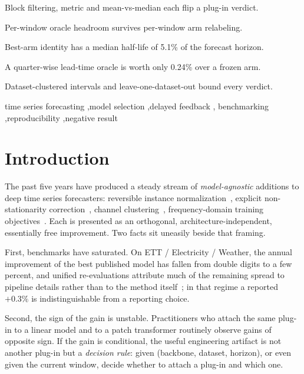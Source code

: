 \documentclass[a4paper,fleqn]{cas-sc}
\begin{document}
\begin{highlights}
\item Block filtering, metric and mean-vs-median each flip a plug-in verdict.
\item Per-window oracle headroom survives per-window arm relabeling.
\item Best-arm identity has a median half-life of 5.1\% of the forecast horizon.
\item A quarter-wise lead-time oracle is worth only 0.24\% over a frozen arm.
\item Dataset-clustered intervals and leave-one-dataset-out bound every verdict.
\end{highlights}

\begin{keywords}
time series forecasting \sep model selection \sep delayed feedback \sep
benchmarking \sep reproducibility \sep negative result
\end{keywords}

\maketitle

\section{Introduction}

The past five years have produced a steady stream of \emph{model-agnostic}
additions to deep time series forecasters: reversible instance
normalization~\cite{revin}, explicit non-stationarity correction~\cite{san},
channel clustering~\cite{ccm}, frequency-domain training objectives~\cite{fredf}. Each is
presented as an orthogonal, architecture-independent, essentially free
improvement. Two facts sit uneasily beside that framing.

First, benchmarks have saturated. On ETT / Electricity / Weather, the annual
improvement of the best published model has fallen from double digits to a few
percent, and unified re-evaluations attribute much of the remaining spread to
pipeline details rather than to the method itself~\cite{tfb,champions}; in that
regime a reported $+0.3\%$ is indistinguishable from a reporting choice.

Second, the sign of the gain is unstable. Practitioners who attach the same
plug-in to a linear model and to a patch transformer routinely observe gains of
opposite sign. If the gain is conditional, the useful engineering artifact is not
another plug-in but a \emph{decision rule}: given (backbone, dataset, horizon), or
even given the current window, decide whether to attach a plug-in and which one.
\end{document}

